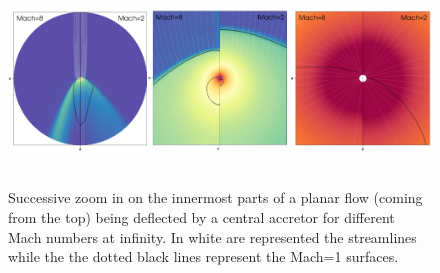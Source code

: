 \documentclass[a4paper,12pt,onecolumn]{article}
\begin{document}
\begin{figure}[!b]
\begin{center}
\includegraphics[height=5.5cm, width=16cm]{Figures/zoom_BHL.png}	
\caption{Successive zoom in on the innermost parts of a planar flow (coming from the top) being deflected by a central accretor for different Mach numbers at infinity. In white are represented the streamlines while the the dotted black lines represent the Mach=1 surfaces.}
\label{fig:zoom_BHL}
\end{center}
\end{figure}
\end{document}
